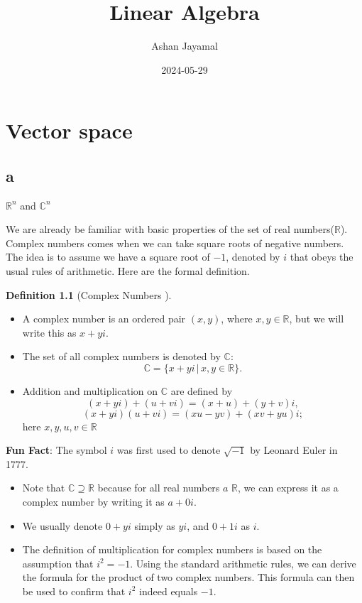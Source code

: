 \documentclass[
]{book}
\title{Linear Algebra}
\author{Ashan Jayamal}
\date{2024-05-29}
\providecommand{\tightlist}{%
  \setlength{\itemsep}{0pt}\setlength{\parskip}{0pt}}
\theoremstyle{definition}
\newtheorem{definition}{Definition}[chapter]
\theoremstyle{definition}
\theoremstyle{definition}
\theoremstyle{definition}
\theoremstyle{remark}
\begin{document}
\maketitle

{
\setcounter{tocdepth}{1}
\tableofcontents
}
\chapter{Vector space}\label{vector-space}

\section{a}\label{a}

\(\mathbb{R}^n\) and \(\mathbb{C}^n\)

We are already be familiar with basic properties of the set of real numbers(\(\mathbb{R}\)). Complex numbers comes when we can take square roots of negative numbers. The idea is to assume we have a square root of \(−1\), denoted by \(i\) that obeys the usual rules of arithmetic. Here are the formal definition.

\begin{definition}[Complex Numbers ]
\protect\hypertarget{def:unnamed-chunk-1}{}\label{def:unnamed-chunk-1}\leavevmode

\begin{itemize}
\tightlist
\item
  A complex number is an ordered pair \((x, y)\), where \(x, y \in \mathbb{R}\), but we will write this as \(x + yi\).
\item
  The set of all complex numbers is denoted by \(\mathbb{C}\):
  \[\mathbb{C} = \{x + yi \,|\, x, y \in \mathbb{R}\}.\]
\item
  Addition and multiplication on \(\mathbb{C}\) are defined by
  \[(x + yi) + (u + vi) = (x + u) + (y + v)i,\]
  \[(x + yi)(u + vi) = (xu - yv) + (xv + yu)i;\]
  here \(x, y, u, v \in \mathbb{R}\)
\end{itemize}

\end{definition}

\textbf{Fun Fact}: The symbol \(i\) was first used to denote \(\sqrt{-1}\) by Leonard Euler in 1777.

\begin{itemize}
\tightlist
\item
  Note that \(\mathbb{C} \supseteq \mathbb{R}\) because for all real numbers \(a\) \(\mathbb{R}\), we can express it as a complex number by writing it as \(a + 0i\).
\item
  We usually denote \(0 + yi\) simply as \(yi\), and \(0 + 1i\) as \(i\).
\item
  The definition of multiplication for complex numbers is based on the assumption that \(i^2 = -1\). Using the standard arithmetic rules, we can derive the formula for the product of two complex numbers. This formula can then be used to confirm that \(i^2\) indeed equals \(-1\).
\end{itemize}
\end{document}
